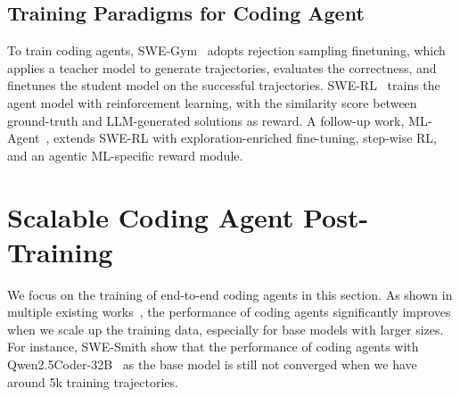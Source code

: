 \documentclass[12pt,openany]{cmuthesis}
\begin{document}
\subsection{Training Paradigms for Coding Agent}
To train coding agents, SWE-Gym~\cite{swegym} adopts rejection sampling finetuning, which applies a teacher model to generate trajectories, evaluates the correctness, and finetunes the student model on the successful trajectories.
SWE-RL~\cite{swerl} trains the agent model with reinforcement learning, with the similarity score between ground-truth and LLM-generated solutions as reward.
A follow-up work, ML-Agent~\cite{mlagent}, extends SWE-RL with exploration-enriched fine-tuning, step-wise RL, and an agentic ML-specific reward module.



\section{Scalable Coding Agent Post-Training}
\label{sec:related-scalable}
We focus on the training of end-to-end coding agents in this section.
As shown in multiple existing works~\citep{swegym,R2EGym,swe-smith}, the performance of coding agents significantly improves when we scale up the training data, especially for base models with larger sizes. For instance, SWE-Smith show that the performance of coding agents with Qwen2.5Coder-32B~\cite{qwen25coder} as the base model is still not converged when we have around 5k training trajectories.
\end{document}
